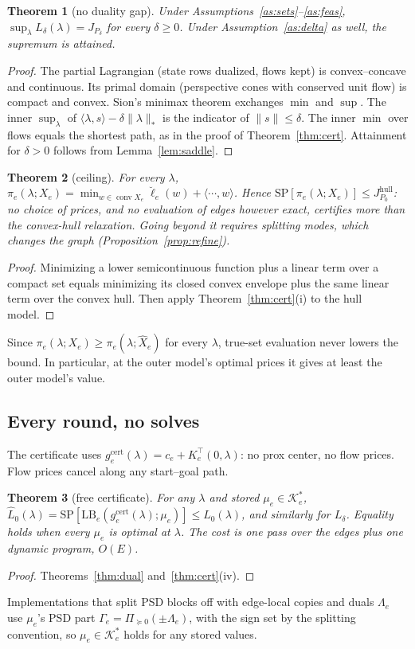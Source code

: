 \documentclass[11pt]{article}
\newcommand{\Jd}{J_{P_\delta}}
\newcommand{\SP}{\mathrm{SP}}
\newcommand{\LB}{\mathrm{LB}}
\newcommand{\conv}{\operatorname{conv}}
\theoremstyle{plain}
\newtheorem{theorem}{Theorem}[section]
\theoremstyle{definition}
\theoremstyle{remark}
\begin{document}
\begin{theorem}[no duality gap]\label{thm:nogap}
Under Assumptions~\ref{as:sets}--\ref{as:feas}, $\sup_\lambda L_\delta(\lambda)=\Jd$ for every $\delta\ge0$. Under Assumption~\ref{as:delta} as well, the supremum is attained.
\end{theorem}
\begin{proof}
The partial Lagrangian (state rows dualized, flows kept) is convex--concave and continuous. Its primal domain (perspective cones with conserved unit flow) is compact and convex. Sion's minimax theorem exchanges $\min$ and $\sup$. The inner $\sup_\lambda$ of $\langle\lambda,s\rangle-\delta\|\lambda\|_*$ is the indicator of $\|s\|\le\delta$. The inner $\min$ over flows equals the shortest path, as in the proof of Theorem~\ref{thm:cert}. Attainment for $\delta>0$ follows from Lemma~\ref{lem:saddle}.
\end{proof}

\begin{theorem}[ceiling]\label{thm:ceiling}
For every $\lambda$, $\pi_e(\lambda;X_e)=\min_{w\in\conv X_e}\breve\ell_e(w)+\langle\cdots,w\rangle$. Hence $\SP[\pi_e(\lambda;X_e)]\le J^{\mathrm{hull}}_{P_0}$: no choice of prices, and no evaluation of edges however exact, certifies more than the convex-hull relaxation. Going beyond it requires splitting modes, which changes the graph (Proposition~\ref{prop:refine}).
\end{theorem}
\begin{proof}
Minimizing a lower semicontinuous function plus a linear term over a compact set equals minimizing its closed convex envelope plus the same linear term over the convex hull. Then apply Theorem~\ref{thm:cert}(i) to the hull model.
\end{proof}
Since $\pi_e(\lambda;X_e)\ge\pi_e(\lambda;\hat X_e)$ for every $\lambda$, true-set evaluation never lowers the bound. In particular, at the outer model's optimal prices it gives at least the outer model's value.

\subsection{Every round, no solves}
The certificate uses $g^{\mathrm{cert}}_e(\lambda)=c_e+K_e^\top(0,\lambda)$: no prox center, no flow prices. Flow prices cancel along any start--goal path.

\begin{theorem}[free certificate]\label{thm:free}
For any $\lambda$ and stored $\mu_e\in\mathcal K_e^*$, $\hat L_0(\lambda)=\SP[\LB_e(g^{\mathrm{cert}}_e(\lambda);\mu_e)]\le L_0(\lambda)$, and similarly for $L_\delta$. Equality holds when every $\mu_e$ is optimal at $\lambda$. The cost is one pass over the edges plus one dynamic program, $O(E)$.
\end{theorem}
\begin{proof}
Theorems~\ref{thm:dual} and~\ref{thm:cert}(iv).
\end{proof}
Implementations that split PSD blocks off with edge-local copies and duals $\Lambda_e$ use $\mu_e$'s PSD part $\Gamma_e=\Pi_{\succeq0}(\pm\Lambda_e)$, with the sign set by the splitting convention, so $\mu_e\in\mathcal K_e^*$ holds for any stored values.
\end{document}
